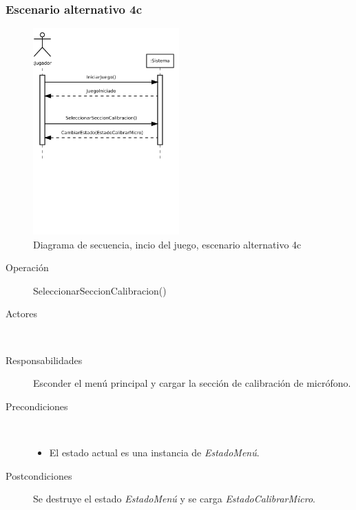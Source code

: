 \subsubsection{Escenario alternativo 4c}
\begin{figure}[h!]
  \centering
  \includegraphics[trim=0cm 12cm 0cm 0cm, clip=true, width=0.5\textwidth]{4_analisis/diagsec_caso1_esc4}
  \caption{Diagrama de secuencia, incio del juego, escenario alternativo 4c}
\end{figure}

\begin{description}
\item[Operación] SeleccionarSeccionCalibracion()
\item[Actores] \jugador\, \sistema\
\item[Responsabilidades] Esconder el menú principal y cargar la sección de
  calibración de micrófono.
\item[Precondiciones] $\quad$
  \begin{itemize}
  \item El estado actual es una instancia de \textit{EstadoMenú}.
  \end{itemize}
\item[Postcondiciones] Se destruye el estado \textit{EstadoMenú} y se carga
  \textit{EstadoCalibrarMicro}.
\end{description}

